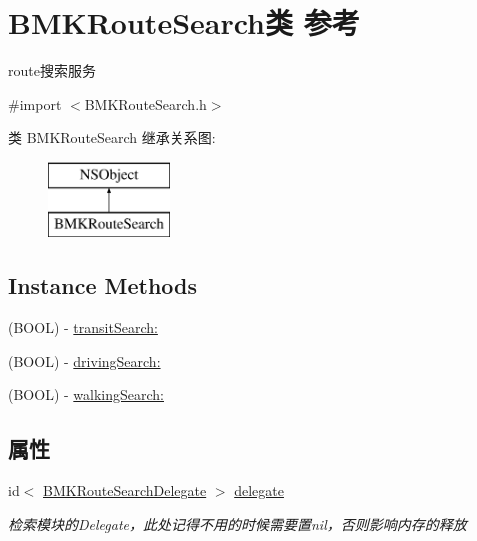 \hypertarget{interface_b_m_k_route_search}{\section{B\+M\+K\+Route\+Search类 参考}
\label{interface_b_m_k_route_search}
}


route搜索服务  




{\ttfamily \#import $<$B\+M\+K\+Route\+Search.\+h$>$}

类 B\+M\+K\+Route\+Search 继承关系图\+:\begin{figure}[H]
\begin{center}
\leavevmode
\includegraphics[height=2.000000cm]{interface_b_m_k_route_search}
\end{center}
\end{figure}
\subsection*{Instance Methods}
\begin{DoxyCompactItemize}
\item 
(B\+O\+O\+L) -\/ \hyperlink{interface_b_m_k_route_search_af5fd9df6e0d4940ca0a2bf7823dc95a8}{transit\+Search\+:}
\item 
(B\+O\+O\+L) -\/ \hyperlink{interface_b_m_k_route_search_a64bca1276cae03de35f61a0f733d6135}{driving\+Search\+:}
\item 
(B\+O\+O\+L) -\/ \hyperlink{interface_b_m_k_route_search_a40676ec66d861873d8e0117feb3e2483}{walking\+Search\+:}
\end{DoxyCompactItemize}
\subsection*{属性}
\begin{DoxyCompactItemize}
\item 
\hypertarget{interface_b_m_k_route_search_a5f41c24c0894bb01bb12cacf5c410d95}{id$<$ \hyperlink{protocol_b_m_k_route_search_delegate-p}{B\+M\+K\+Route\+Search\+Delegate} $>$ \hyperlink{interface_b_m_k_route_search_a5f41c24c0894bb01bb12cacf5c410d95}{delegate}}\label{interface_b_m_k_route_search_a5f41c24c0894bb01bb12cacf5c410d95}

\begin{DoxyCompactList}\small\item\em 检索模块的\+Delegate，此处记得不用的时候需要置nil，否则影响内存的释放 \end{DoxyCompactList}\end{DoxyCompactItemize}


